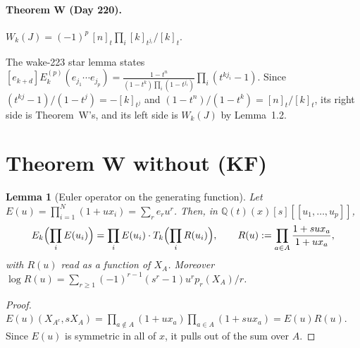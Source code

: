 \documentclass[10pt]{article}
\newtheorem{lemma}{Lemma}[section]
\begin{document}
\paragraph{Theorem W (Day 220).} $W_k(J)=(-1)^p\,[n]_t\prod_i[k]_{t^{j_i}}\big/[k]_t$.

\noindent The wake-223 star lemma states
$[e_{k+d}]E_k^{(p)}(e_{j_1}\cdots e_{j_p})=\frac{1-t^n}{(1-t^k)\prod_i(1-t^{j_i})}\prod_i(t^{kj_i}-1)$. Since
$(t^{kj}-1)/(1-t^j)=-[k]_{t^j}$ and $(1-t^n)/(1-t^k)=[n]_t/[k]_t$, its right side is Theorem~W's, and its left side
is $W_k(J)$ by Lemma~1.2.

\section{Theorem W without (KF)}

\begin{lemma}[Euler operator on the generating function]
Let $E(u)=\prod_{i=1}^N(1+ux_i)=\sum_re_ru^r$. Then, in $\mathbb{Q}(t)(x)[s][[u_1,\dots,u_p]]$,
\[
E_k\Bigl(\prod_iE(u_i)\Bigr)=\prod_iE(u_i)\cdot T_k\Bigl(\prod_iR(u_i)\Bigr),\qquad
R(u):=\prod_{a\in A}\frac{1+sux_a}{1+ux_a},
\]
with $R(u)$ read as a function of $X_A$. Moreover $\log R(u)=\sum_{r\ge1}(-1)^{r-1}(s^r-1)u^rp_r(X_A)/r$.
\end{lemma}
\begin{proof}
$E(u)(X_{A^c},sX_A)=\prod_{a\notin A}(1+ux_a)\prod_{a\in A}(1+sux_a)=E(u)R(u)$. Since $E(u)$ is symmetric in all of
$x$, it pulls out of the sum over $A$.
\end{proof}
\end{document}
